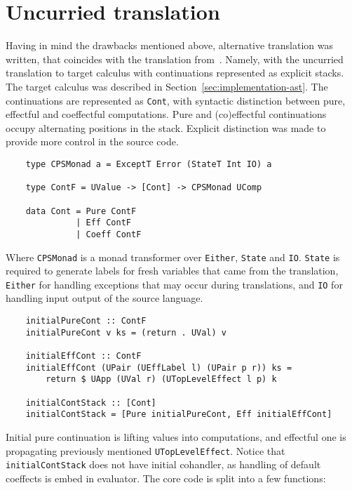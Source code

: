 \documentclass[declaration,shortabstract]{iithesis}
\theoremstyle{definition} \newtheorem{definition}{Definition}[chapter]
\theoremstyle{remark} \newtheorem{remark}[definition]{Observation}
\theoremstyle{plain} \newtheorem{theorem}[definition]{Theorem}
\theoremstyle{plain} \newtheorem{lemma}[definition]{Lemma}
\begin{document}
    \section{Uncurried translation}

    Having in mind the drawbacks mentioned above, alternative translation was
    written, that coincides with the translation from~\cite{handlers-cps-journal}.
    Namely, with the uncurried translation to target calculus with continuations
    represented as explicit stacks. The target calculus was described in
    Section~\ref{sec:implementation-ast}. The continuations are represented as
    \verb!Cont!, with syntactic distinction between pure, effectful and
    coeffectful computations. Pure and (co)effectful continuations occupy
    alternating positions in the stack. Explicit distinction was made to provide
    more control in the source code.

\begin{verbatim}
    type CPSMonad a = ExceptT Error (StateT Int IO) a

    type ContF = UValue -> [Cont] -> CPSMonad UComp

    data Cont = Pure ContF
              | Eff ContF
              | Coeff ContF
\end{verbatim}

    \noindent
    Where \verb!CPSMonad! is a monad transformer over \verb!Either!, \verb!State!
    and \verb!IO!. \verb!State! is required to generate labels for fresh variables
    that came from the translation, \verb!Either! for handling exceptions that
    may occur during translations, and \verb!IO! for handling input output of the
    source language.

\begin{verbatim}
    initialPureCont :: ContF
    initialPureCont v ks = (return . UVal) v

    initialEffCont :: ContF
    initialEffCont (UPair (UEffLabel l) (UPair p r)) ks =
        return $ UApp (UVal r) (UTopLevelEffect l p) k

    initialContStack :: [Cont]
    initialContStack = [Pure initialPureCont, Eff initialEffCont]
\end{verbatim}

    \noindent
    Initial pure continuation is lifting values into computations,
    and effectful one is propagating previously mentioned \verb!UTopLevelEffect!.
    Notice that \verb!initialContStack! does not have initial cohandler,
    as handling of default coeffects is embed in evaluator. The core code is
    split into a few functions:
\end{document}
